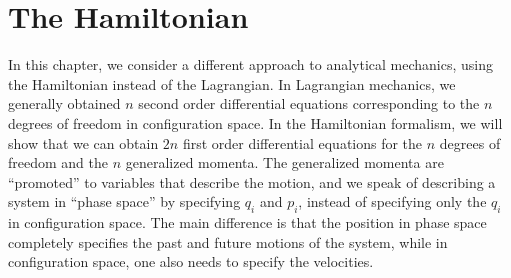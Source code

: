 \chapter{The Hamiltonian}
In this chapter, we consider a different approach to analytical mechanics, using the Hamiltonian instead of the Lagrangian. In Lagrangian mechanics, we generally obtained $n$ second order differential equations corresponding to the $n$ degrees of freedom in configuration space. In the Hamiltonian formalism, we will show that we can obtain $2n$ first order differential equations for the $n$ degrees of freedom and the $n$ generalized momenta. The generalized momenta are ``promoted'' to variables that describe the motion, and we speak of describing a system in ``phase space'' by specifying $q_i$ and $p_i$, instead of specifying only the $q_i$ in configuration space. The main difference is that the position in phase space completely specifies the past and future motions of the system, while in configuration space, one also needs to specify the velocities.

